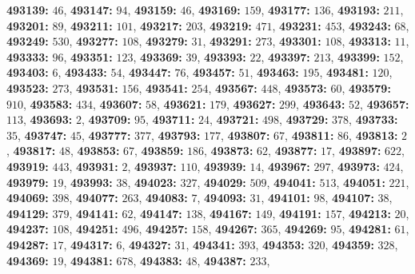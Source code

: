 \textsf{\bfseries 493139:} $46$, \textsf{\bfseries 493147:} $94$, \textsf{\bfseries 493159:} $46$, \textsf{\bfseries 493169:} $159$, \textsf{\bfseries 493177:} $136$, \textsf{\bfseries 493193:} $211$, \textsf{\bfseries 493201:} $89$, \textsf{\bfseries 493211:} $101$, \textsf{\bfseries 493217:} $203$, \textsf{\bfseries 493219:} $471$, \textsf{\bfseries 493231:} $453$, \textsf{\bfseries 493243:} $68$, \textsf{\bfseries 493249:} $530$, \textsf{\bfseries 493277:} $108$, \textsf{\bfseries 493279:} $31$, \textsf{\bfseries 493291:} $273$, \textsf{\bfseries 493301:} $108$, \textsf{\bfseries 493313:} $11$, \textsf{\bfseries 493333:} $96$, \textsf{\bfseries 493351:} $123$, \textsf{\bfseries 493369:} $39$, \textsf{\bfseries 493393:} $22$, \textsf{\bfseries 493397:} $213$, \textsf{\bfseries 493399:} $152$, \textsf{\bfseries 493403:} $6$, \textsf{\bfseries 493433:} $54$, \textsf{\bfseries 493447:} $76$, \textsf{\bfseries 493457:} $51$, \textsf{\bfseries 493463:} $195$, \textsf{\bfseries 493481:} $120$, \textsf{\bfseries 493523:} $273$, \textsf{\bfseries 493531:} $156$, \textsf{\bfseries 493541:} $254$, \textsf{\bfseries 493567:} $448$, \textsf{\bfseries 493573:} $60$, \textsf{\bfseries 493579:} $910$, \textsf{\bfseries 493583:} $434$, \textsf{\bfseries 493607:} $58$, \textsf{\bfseries 493621:} $179$, \textsf{\bfseries 493627:} $299$, \textsf{\bfseries 493643:} $52$, \textsf{\bfseries 493657:} $113$, \textsf{\bfseries 493693:} $2$, \textsf{\bfseries 493709:} $95$, \textsf{\bfseries 493711:} $24$, \textsf{\bfseries 493721:} $498$, \textsf{\bfseries 493729:} $378$, \textsf{\bfseries 493733:} $35$, \textsf{\bfseries 493747:} $45$, \textsf{\bfseries 493777:} $377$, \textsf{\bfseries 493793:} $177$, \textsf{\bfseries 493807:} $67$, \textsf{\bfseries 493811:} $86$, \textsf{\bfseries 493813:} $2$, \textsf{\bfseries 493817:} $48$, \textsf{\bfseries 493853:} $67$, \textsf{\bfseries 493859:} $186$, \textsf{\bfseries 493873:} $62$, \textsf{\bfseries 493877:} $17$, \textsf{\bfseries 493897:} $622$, \textsf{\bfseries 493919:} $443$, \textsf{\bfseries 493931:} $2$, \textsf{\bfseries 493937:} $110$, \textsf{\bfseries 493939:} $14$, \textsf{\bfseries 493967:} $297$, \textsf{\bfseries 493973:} $424$, \textsf{\bfseries 493979:} $19$, \textsf{\bfseries 493993:} $38$, \textsf{\bfseries 494023:} $327$, \textsf{\bfseries 494029:} $509$, \textsf{\bfseries 494041:} $513$, \textsf{\bfseries 494051:} $221$, \textsf{\bfseries 494069:} $398$, \textsf{\bfseries 494077:} $263$, \textsf{\bfseries 494083:} $7$, \textsf{\bfseries 494093:} $31$, \textsf{\bfseries 494101:} $98$, \textsf{\bfseries 494107:} $38$, \textsf{\bfseries 494129:} $379$, \textsf{\bfseries 494141:} $62$, \textsf{\bfseries 494147:} $138$, \textsf{\bfseries 494167:} $149$, \textsf{\bfseries 494191:} $157$, \textsf{\bfseries 494213:} $20$, \textsf{\bfseries 494237:} $108$, \textsf{\bfseries 494251:} $496$, \textsf{\bfseries 494257:} $158$, \textsf{\bfseries 494267:} $365$, \textsf{\bfseries 494269:} $95$, \textsf{\bfseries 494281:} $61$, \textsf{\bfseries 494287:} $17$, \textsf{\bfseries 494317:} $6$, \textsf{\bfseries 494327:} $31$, \textsf{\bfseries 494341:} $393$, \textsf{\bfseries 494353:} $320$, \textsf{\bfseries 494359:} $328$, \textsf{\bfseries 494369:} $19$, \textsf{\bfseries 494381:} $678$, \textsf{\bfseries 494383:} $48$, \textsf{\bfseries 494387:} $233$, 
